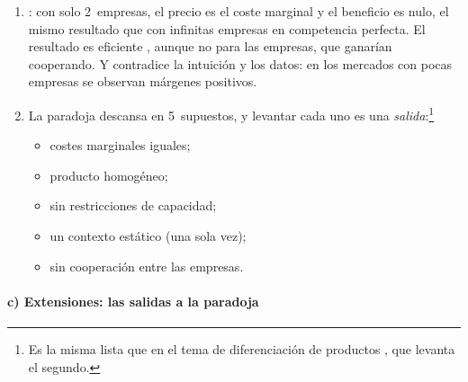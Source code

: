 \documentclass[11pt]{article}
\begin{document}
\begin{enumerate}
\item {}: con solo 2~empresas, el precio es el coste marginal y el beneficio es nulo, el mismo resultado que con infinitas empresas en competencia perfecta. El resultado es eficiente , aunque no para las empresas, que ganarían cooperando. Y contradice la intuición y los datos: en los mercados con pocas empresas se observan márgenes positivos.
\item La paradoja descansa en 5~supuestos, y levantar cada uno es una \emph{salida}:\footnote{Es la misma lista que en el tema de diferenciación de productos , que levanta el segundo.}
  \begin{itemize}
  \item costes marginales iguales;
  \item producto homogéneo;
  \item sin restricciones de capacidad;
  \item un contexto estático (una sola vez);
  \item sin cooperación entre las empresas.
  \end{itemize}
\end{enumerate}

\paragraph{c) Extensiones: las salidas a la paradoja}
\end{document}
